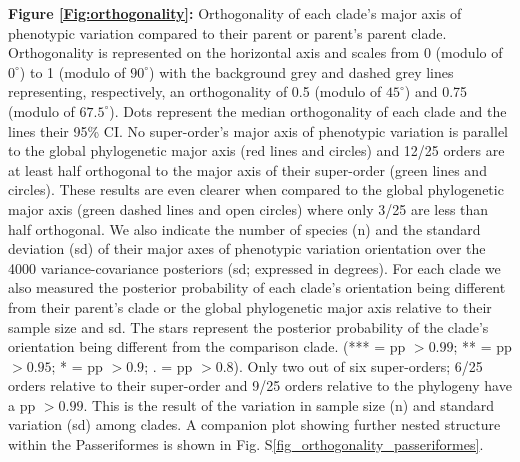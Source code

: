 \documentclass[12pt,letterpaper]{article}
\begin{document}
\noindent \textbf{Figure \ref{Fig:orthogonality}:}
Orthogonality of each clade's major axis of phenotypic variation compared to their parent or parent's parent clade.
Orthogonality is represented on the horizontal axis and scales from 0 (modulo of $0^\circ$) to 1 (modulo of $90^\circ$) with the background grey and dashed grey lines representing, respectively, an orthogonality of 0.5 (modulo of $45^\circ$) and 0.75 (modulo of $67.5^\circ$).
Dots represent the median orthogonality of each clade and the lines their 95\% CI.
No super-order's major axis of phenotypic variation is parallel to the global phylogenetic major axis (red lines and circles) and 12/25 orders are at least half orthogonal to the major axis of their super-order (green lines and circles).
These results are even clearer when compared to the global phylogenetic major axis (green dashed lines and open circles) where only 3/25 are less than half orthogonal.
We also indicate the number of species (n) and the standard deviation (sd) of their major axes of phenotypic variation orientation over the 4000 variance-covariance posteriors (sd; expressed in degrees).
For each clade we also measured the posterior probability of each clade's orientation being different from their parent's clade or the global phylogenetic major axis relative to their sample size and sd.
The stars represent the posterior probability of the clade's orientation being different from the comparison clade. (*** = pp $> 0.99$; ** = pp $>0.95$; * = pp $> 0.9$; . = pp $> 0.8$).
Only two out of six super-orders; 6/25 orders relative to their super-order and 9/25 orders relative to the phylogeny have a pp $> 0.99$.
This is the result of the variation in sample size (n) and standard variation (sd) among clades. 
A companion plot showing further nested structure within the Passeriformes is shown in Fig. S\ref{fig_orthogonality_passeriformes}.

\bigskip
\end{document}
